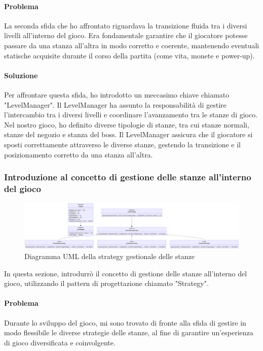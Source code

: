 \documentclass[a4paper,12pt]{report}
\begin{document}
\paragraph{Problema}
La seconda sfida che ho affrontato riguardava la transizione fluida tra i diversi livelli all'interno del gioco. 
Era fondamentale garantire che il giocatore potesse passare da una stanza all'altra in modo corretto e coerente, mantenendo eventuali statische acquisite durante il corso della partita (come vita, monete e power-up).
\paragraph{Soluzione}
Per affrontare questa sfida, ho introdotto un meccasimo chiave chiamato "LevelManager".
Il LevelManager ha assunto la responsabilità di gestire l'intercambio tra i diversi livelli e coordinare l'avanzamento tra le stanze di gioco. 
Nel nostro gioco, ho definito diverse tipologie di stanze, tra cui stanze normali, stanze del negozio e stanza del boss.
Il LevelManager assicura che il giocatore si sposti correttamente attraverso le diverse stanze, gestendo la transizione e il posizionamento corretto da una stanza all'altra.
\subsubsection*{Introduzione al concetto di gestione delle stanze all'interno del gioco}

\begin{figure}[h]
	\centering
	\includegraphics[width=\textwidth]{uml/RoomStrategy1}
	\caption{Diagramma UML della strategy gestionale delle stanze}
\end{figure}

In questa sezione, introdurrò il concetto di gestione delle stanze all'interno del gioco, utilizzando il pattern di progettazione chiamato "Strategy".
\paragraph*{Problema}
Durante lo sviluppo del gioco, mi sono trovato di fronte alla sfida di gestire in modo flessibile le diverse strategie delle stanze, al fine di garantire un'esperienza di gioco diversificata e coinvolgente.
\end{document}
